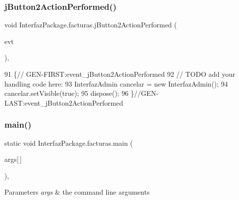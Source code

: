 \subsubsection{\texorpdfstring{j\+Button2\+Action\+Performed()}{jButton2ActionPerformed()}}
{\footnotesize\ttfamily void Interfaz\+Package.\+facturas.\+j\+Button2\+Action\+Performed (\begin{DoxyParamCaption}\item[{java.\+awt.\+event.\+Action\+Event}]{evt }\end{DoxyParamCaption})\hspace{0.3cm}{\ttfamily [inline]}, {\ttfamily [private]}}


\begin{DoxyCode}
91                                                                          \{\textcolor{comment}{//
      GEN-FIRST:event\_jButton2ActionPerformed}
92         \textcolor{comment}{// TODO add your handling code here:}
93         InterfazAdmin cancelar = \textcolor{keyword}{new} InterfazAdmin();
94         cancelar.setVisible(\textcolor{keyword}{true});
95         dispose();
96     \}\textcolor{comment}{//GEN-LAST:event\_jButton2ActionPerformed}
\end{DoxyCode}
\mbox{\label{class_interfaz_package_1_1facturas_a27653f6f8bf303404e4f16dd03c1ef7b}} 
\subsubsection{\texorpdfstring{main()}{main()}}
{\footnotesize\ttfamily static void Interfaz\+Package.\+facturas.\+main (\begin{DoxyParamCaption}\item[{String}]{args\mbox{[}$\,$\mbox{]} }\end{DoxyParamCaption})\hspace{0.3cm}{\ttfamily [inline]}, {\ttfamily [static]}}


\begin{DoxyParams}{Parameters}
{\em args} & the command line arguments \\
\hline
\end{DoxyParams}

